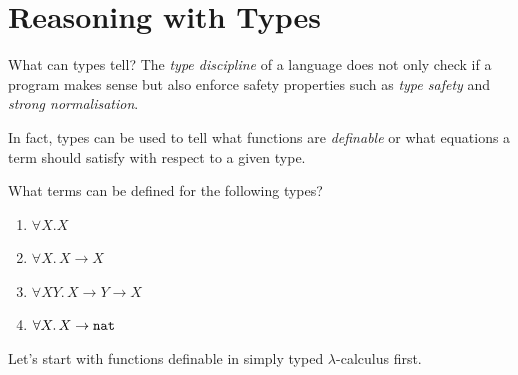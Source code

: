 \section{Reasoning with Types}

\begin{frame}{What can types tell?}
  The \emph{type discipline} of a language does not only check if a program makes sense but also enforce safety properties such as \emph{type safety} and \emph{strong normalisation}.

  In fact, types can be used to tell what functions are \emph{definable} or what equations a term should satisfy with respect to a given type.

  What terms can be defined for the following types?
  \begin{enumerate}
    \item $\forall X. X$
    \item $\forall X.\, X \to X$
    \item $\forall X Y.\, X \to Y \to X$
    \item $\forall X.\, X \to \mathtt{nat}$
  \end{enumerate}

  Let's start with functions definable in simply typed $\lambda$-calculus first.
\end{frame}

